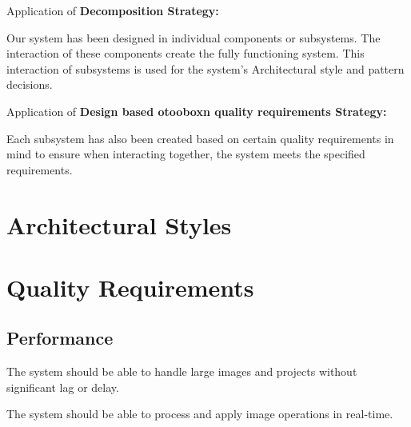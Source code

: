 \documentclass[11pt,a4paper]{article}
\begin{document}
Application of \textbf{Decomposition Strategy:}

Our system has been designed in individual components or subsystems. The interaction of these components create the fully functioning system. This interaction of subsystems is used for the system's Architectural style and pattern decisions.

Application of \textbf{Design based otooboxn quality requirements Strategy:}

Each subsystem has also been created based on certain quality requirements in mind to ensure when interacting together, the system meets the specified requirements.





\section*{Architectural Styles}

\pagebreak

\section*{Quality Requirements}

\subsection*{Performance}

The system should be able to handle large images and projects without
significant lag or delay.

The system should be able to process and apply image operations in real-time.
\end{document}
